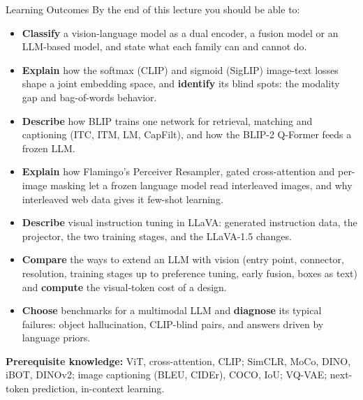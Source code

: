 \begin{frame}{Learning Outcomes}
  \setlength{\parskip}{0pt}
  By the end of this lecture you should be able to:
  \begin{itemize}\footnotesize\itemsep0.25em
    \item \textbf{Classify} a vision-language model as a dual encoder, a fusion model or an LLM-based model, and state what each family can and cannot do.
    \item \textbf{Explain} how the softmax (CLIP) and sigmoid (SigLIP) image-text losses shape a joint embedding space, and \textbf{identify} its blind spots: the modality gap and bag-of-words behavior.
    \item \textbf{Describe} how BLIP trains one network for retrieval, matching and captioning (ITC, ITM, LM, CapFilt), and how the BLIP-2 Q-Former feeds a frozen LLM.
    \item \textbf{Explain} how Flamingo's Perceiver Resampler, gated cross-attention and per-image masking let a frozen language model read interleaved images, and why interleaved web data gives it few-shot learning.
    \item \textbf{Describe} visual instruction tuning in LLaVA: generated instruction data, the projector, the two training stages, and the LLaVA-1.5 changes.
    \item \textbf{Compare} the ways to extend an LLM with vision (entry point, connector, resolution, training stages up to preference tuning, early fusion, boxes as text) and \textbf{compute} the visual-token cost of a design.
    \item \textbf{Choose} benchmarks for a multimodal LLM and \textbf{diagnose} its typical failures: object hallucination, CLIP-blind pairs, and answers driven by language priors.
  \end{itemize}
  \vspace{0.3em}
  {\footnotesize \textbf{Prerequisite knowledge:} ViT, cross-attention, CLIP; SimCLR, MoCo, DINO, iBOT, DINOv2; image captioning (BLEU, CIDEr), COCO, IoU; VQ-VAE; next-token prediction, in-context learning.\par}
\end{frame}
